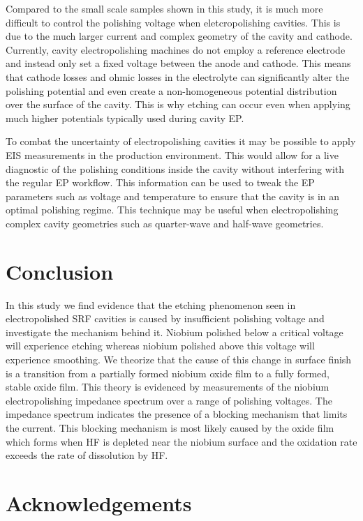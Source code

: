 Compared to the small scale samples shown in this study, it is much more difficult to control the polishing voltage when eletcropolishing cavities. This is due to the much larger current and complex geometry of the cavity and cathode. Currently, cavity electropolishing machines do not employ a reference electrode and instead only set a fixed voltage between the anode and cathode. This means that cathode losses and ohmic losses in the electrolyte can significantly alter the polishing potential and even create a non-homogeneous potential distribution over the surface of the cavity. This is why etching can occur even when applying much higher potentials typically used during cavity EP.

To combat the uncertainty of electropolishing cavities it may be possible to apply EIS measurements in the production environment. This would allow for a live diagnostic of the polishing conditions inside the cavity without interfering with the regular EP workflow. This information can be used to tweak the EP parameters such as voltage and temperature to ensure that the cavity is in an optimal polishing regime. This technique may be useful when electropolishing complex cavity geometries such as quarter-wave and half-wave geometries.



\section{Conclusion}
\label{sec:org57282ed}
In this study we find evidence that the etching phenomenon seen in electropolished SRF cavities is caused by insufficient polishing voltage and investigate the mechanism behind it. Niobium polished below a critical voltage will experience etching whereas niobium polished above this voltage will experience smoothing. We theorize that the cause of this change in surface finish is a transition from a partially formed niobium oxide film to a fully formed, stable oxide film. This theory is evidenced by measurements of the niobium electropolishing impedance spectrum over a range of polishing voltages. The impedance spectrum indicates the presence of a blocking mechanism that limits the current. This blocking mechanism is most likely caused by the oxide film which forms when HF is depleted near the niobium surface and the oxidation rate exceeds the rate of dissolution by HF.


\section{Acknowledgements}

